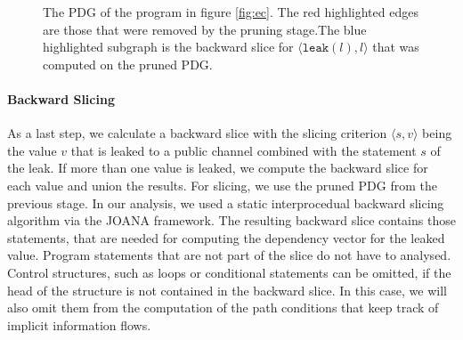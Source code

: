 \begin{figure}
    \centering
    \caption{The PDG of the program in figure \ref{fig:ec}. The red highlighted edges are those that were removed by the pruning stage.The blue highlighted subgraph is the backward slice for $\langle \mathtt{leak}(l), l \rangle$ that was computed on the pruned PDG. }
    \label{fig:prune}
\end{figure}

\paragraph{Backward Slicing}
As a last step, we calculate a backward slice with the slicing criterion $\langle s, v \rangle$ being the value $v$ that is leaked to a public channel combined with the statement $s$ of the leak. If more than one value is leaked, we compute the backward slice for each value and union the results.  For slicing, we use the pruned PDG from the previous stage. In our analysis, we used a static interprocedual backward slicing algorithm via the JOANA framework. 
The resulting backward slice contains those statements, that are needed for computing the dependency vector for the leaked value. Program statements that are not part of the slice do not have to analysed. Control structures, such as loops or conditional statements can be omitted, if the head of the structure is not contained in the backward slice. In this case, we will also omit them from the computation of the path conditions that keep track of implicit information flows.

